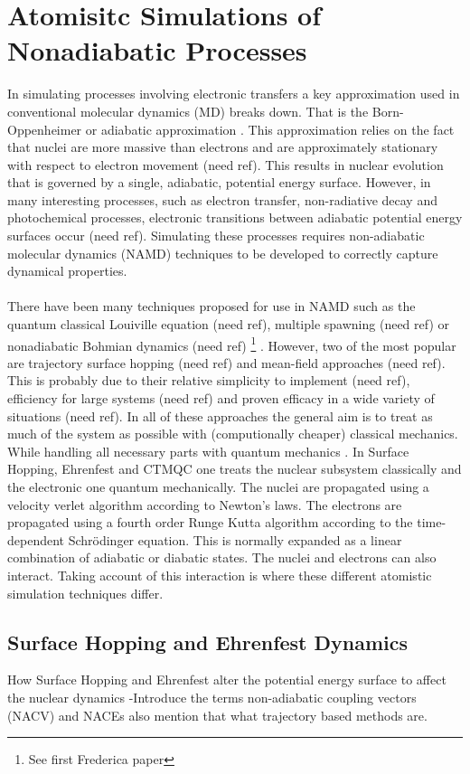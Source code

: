 \section{Atomisitc Simulations of Nonadiabatic Processes}
In simulating processes involving electronic transfers a key approximation used in conventional molecular dynamics (MD) breaks down. That is the Born-Oppenheimer or adiabatic approximation \cite{john_c._tully_nonadiabatic_nodate}. This approximation relies on the fact that nuclei are more massive than electrons and are approximately stationary with respect to electron movement (need ref). This results in nuclear evolution that is governed by a single, adiabatic, potential energy surface. However, in many interesting processes, such as electron transfer, non-radiative decay and photochemical processes, electronic transitions between adiabatic potential energy surfaces occur (need ref). Simulating these processes requires non-adiabatic molecular dynamics (NAMD) techniques to be developed to correctly capture dynamical properties.
\\\\
There have been many techniques proposed for use in NAMD such as the quantum classical Louiville equation (need ref), multiple spawning (need ref) or nonadiabatic Bohmian dynamics (need ref) \footnote{See first Frederica paper} . However, two of the most popular are trajectory surface hopping (need ref) and mean-field approaches (need ref). This is probably due to their relative simplicity to implement (need ref), efficiency for large systems (need ref) and proven efficacy in a wide variety of situations (need ref). In all of these approaches the general aim is to treat as much of the system as possible with (computionally cheaper) classical mechanics. While handling all necessary parts with quantum mechanics \cite{Coker1995Jan}. In Surface Hopping, Ehrenfest and CTMQC one treats the nuclear subsystem classically and the electronic one quantum mechanically. The nuclei are propagated using a velocity verlet algorithm according to Newton's laws. The electrons are propagated using a fourth order Runge Kutta algorithm according to the time-dependent Schr\"odinger equation. This is normally expanded as a linear combination of adiabatic or diabatic states. The nuclei and electrons can also interact. Taking account of this interaction is where these different atomistic simulation techniques differ.

\subsection{Surface Hopping and Ehrenfest Dynamics}
{\LARGE How Surface Hopping and Ehrenfest alter the potential energy surface to affect the nuclear dynamics -Introduce the terms non-adiabatic coupling vectors (NACV) and NACEs also mention that what trajectory based methods are.}
\newpage



